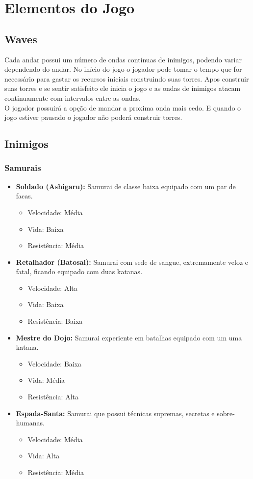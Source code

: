 \documentclass[12pt,a4paper]{article}
\begin{document}
\section{Elementos do Jogo}

\subsection{Waves}
	Cada andar possui um número de ondas contínuas de inimigos, podendo variar dependendo do andar. No início do jogo o jogador pode tomar o tempo que for necessário para gastar os recursos iniciais construindo suas torres. Apos construir suas torres e se sentir satisfeito ele inicia o jogo e as ondas de inimigos atacam continuamente com intervalos entre as ondas.\\
	O jogador possuirá a opção de mandar a proxima onda mais cedo. E quando o jogo estiver pausado o jogador não poderá construir torres.\\

\subsection{Inimigos}
\subsubsection{Samurais}
\begin{itemize}
\item \textbf{Soldado (Ashigaru):} Samurai de classe baixa equipado com um par de facas.
	\begin{itemize}
	\item Velocidade: Média
	\item Vida: Baixa
	\item Resistência: Média
	\end{itemize}
\item \textbf{Retalhador (Batosai):} Samurai com sede de sangue, extremamente veloz e fatal, ficando equipado com duas katanas.
	\begin{itemize}
	\item Velocidade: Alta
	\item Vida: Baixa
	\item Resistência: Baixa
	\end{itemize}
\item \textbf{Mestre do Dojo:} Samurai experiente em batalhas equipado com um uma katana.
	\begin{itemize}
	\item Velocidade: Baixa
	\item Vida: Média
	\item Resistência: Alta
	\end{itemize}
\item \textbf{Espada-Santa:} Samurai que possui técnicas supremas, secretas e sobre-humanas.
	\begin{itemize}
	\item Velocidade: Média
	\item Vida: Alta
	\item Resistência: Média
	\end{itemize}
\end{itemize}
\end{document}
